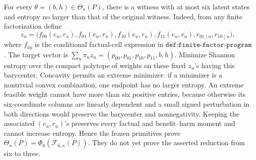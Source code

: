 For every \(\theta=(b,h)\in\Theta_\kappa(P)\), there is a witness with at most six latent states and entropy no larger than that of the original witness.  Indeed, from any finite factorization define
\[
 z_u=\bigl(f_{00}(e_u,r_u),f_{01}(e_u,r_u),f_{10}(e_u,r_u),f_{11}(e_u,r_u),r_{01\mid u},r_{10\mid u}\bigr),
\]
where \(f_{ay}\) is the conditional factual-cell expression in \(\texttt{def:finite-factor-program}\).  The target vector is \(\sum_u\pi_u z_u=(p_{00},p_{01},p_{10},p_{11},b,h)\).  Minimize Shannon entropy over the compact polytope of weights on these fixed \(z_u\)'s having this barycenter.  Concavity permits an extreme minimizer: if a minimizer is a nontrivial convex combination, one endpoint has no larger entropy.  An extreme feasible weight cannot have more than six positive entries, because otherwise its six-coordinate columns are linearly dependent and a small signed perturbation in both directions would preserve the barycenter and nonnegativity.  Keeping the associated \((e_u,r_u)\)'s preserves every factual and benefit--harm moment and cannot increase entropy.  Hence the frozen primitives prove \(\Theta_\kappa(P)=\Phi_6(\mathcal F_{6,\kappa}(P))\).  They do not yet prove the asserted reduction from six to three.